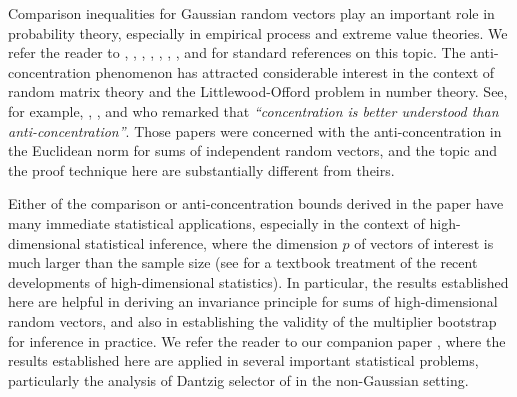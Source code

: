 \documentclass[11pt,reqno]{amsart}
\theoremstyle{definition}
\begin{document}


Comparison inequalities for Gaussian random vectors play an important role in probability theory, especially in empirical process and extreme value theories.
We refer the reader to \cite{Slepian1962}, \cite{Leadbetter1983}, \cite{G85}, \cite{LT91}, \cite{LS01}, \cite{LS02}, \cite{Chatterjee2005b}, and \cite{Y09} for standard references on this topic.
The anti-concentration phenomenon has attracted considerable interest in the context of random matrix theory and the Littlewood-Offord problem in number theory. See, for example, \cite{RV08}, \cite{RV09}, and \cite{VR07} who remarked that \textit{``concentration is better understood than anti-concentration''}.
Those papers were concerned with the anti-concentration in the Euclidean norm for sums of independent random vectors, and  the topic and the proof technique here are substantially different from theirs.

Either of the comparison or anti-concentration bounds derived in the paper have many immediate statistical applications, especially in the context of high-dimensional statistical inference, where the dimension $p$ of vectors of interest is much larger than the sample size (see \cite{BV11} for a textbook treatment of the recent developments of high-dimensional statistics). In particular,
the results established here are helpful in deriving an invariance principle for sums of high-dimensional random vectors, and also in establishing
the validity of the multiplier bootstrap for inference in practice.  We refer the reader to our companion paper \cite{CCK12}, where
the results established here are applied in several important statistical problems, particularly the analysis of Dantzig selector of \cite{CandesTao2007} in the non-Gaussian setting.
\end{document}
